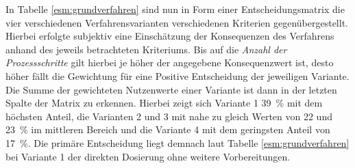 In Tabelle \ref{esm:grundverfahren} sind nun in Form einer Entscheidungsmatrix die vier verschiedenen Verfahrensvarianten verschiedenen Kriterien gegenübergestellt. Hierbei erfolgte subjektiv eine Einschätzung der Konsequenzen des Verfahrens anhand des jeweils betrachteten Kriteriums. Bis auf die \textit{Anzahl der Prozessschritte} gilt hierbei je höher der angegebene Konsequenzwert ist, desto höher fällt die Gewichtung für eine Positive Entscheidung der jeweiligen Variante. Die Summe der gewichteten Nutzenwerte einer Variante ist dann in der letzten Spalte der Matrix zu erkennen. Hierbei zeigt sich Variante 1 \SI{39}{\percent} mit dem höchsten Anteil, die Varianten 2 und 3 mit nahe zu gleich Werten von 22 und \SI{23}{\percent} im mittleren Bereich und die Variante 4 mit dem geringsten Anteil von \SI{17}{\percent}. Die primäre Entscheidung liegt demnach laut Tabelle \ref{esm:grundverfahren} bei Variante 1 der direkten Dosierung ohne weitere Vorbereitungen.

